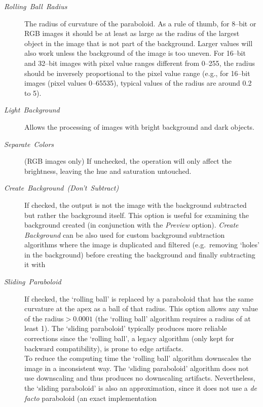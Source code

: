 \begin{description}
\item [{\emph{Rolling\ Ball\ Radius}}] The radius
of curvature of the paraboloid. As a rule of thumb, for 8--bit or
RGB images it should be at least as large as the radius of the largest
object in the image that is not part of the background. Larger values
will also work unless the background of the image is too uneven. For
16--bit and 32--bit images with pixel value ranges different from
0--255, the radius should be inversely proportional to the pixel value
range (e.g., for 16--bit images (pixel values 0--65535), typical values
of the radius are around 0.2 to 5).
\item [{\emph{Light\ Background}}] Allows the processing of images with
bright background and dark objects.
\item [{\emph{Separate\ Colors}}] (RGB images only) If unchecked, the
operation will only affect the brightness, leaving the hue and saturation
untouched.
\item [{\emph{Create}\ \emph{Background\ (Don't\ Subtract)}}] If checked,
the output is not the image with the background subtracted but rather
the background itself. This option is useful for examining the background
created (in conjunction with the \emph{Preview} option). \emph{Create
Background} can be also used for custom background subtraction algorithms
where the image is duplicated and filtered (e.g.\ removing `holes'
in the background) before creating the background and finally subtracting
it with 
\item [{\emph{Sliding}\ \emph{Paraboloid}}] If
checked, the `rolling ball' is replaced by a paraboloid that has
the same curvature at the apex as a ball of that radius. This option
allows any value of the radius$>0.0001$ (the `rolling ball' algorithm
requires a radius of at least 1). The `sliding paraboloid' typically
produces more reliable corrections since the `rolling ball', a legacy
algorithm (only kept for backward compatibility), is prone to edge
artifacts.\\
To reduce the computing time the `rolling ball' algorithm downscales
the image in a inconsistent way. The `sliding paraboloid' algorithm
does not use downscaling and thus produces no downscaling artifacts.
Nevertheless, the `sliding paraboloid' is also an approximation,
since it does not use a \emph{de facto} paraboloid (an exact implementation

\end{description}
